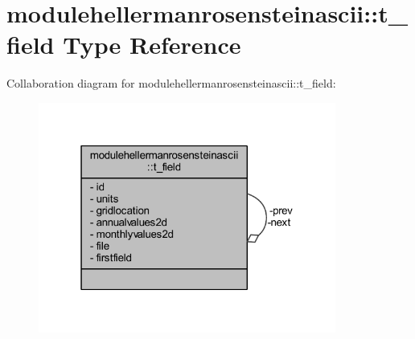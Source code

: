\hypertarget{structmodulehellermanrosensteinascii_1_1t__field}{}\section{modulehellermanrosensteinascii\+:\+:t\+\_\+field Type Reference}
\label{structmodulehellermanrosensteinascii_1_1t__field}


Collaboration diagram for modulehellermanrosensteinascii\+:\+:t\+\_\+field\+:\nopagebreak
\begin{figure}[H]
\begin{center}
\leavevmode
\includegraphics[width=277pt]{structmodulehellermanrosensteinascii_1_1t__field__coll__graph}
\end{center}
\end{figure}
